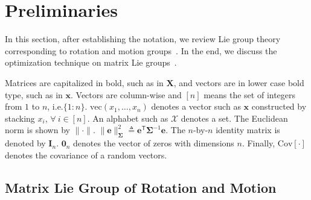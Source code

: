 \documentclass[conference]{IEEEtran}
\newcommand{\transpose}{\mathsf{T}}
\newcommand{\Cov}[1]{\mathrm{Cov}[#1]} %
\begin{document}
\section{Preliminaries}
\label{sec:preliminaries}

In this section, after establishing the notation, we review Lie group theory corresponding to rotation and motion groups~\citep{murray1994mathematical,chirikjian2011stochastic}. In the end, we discuss the optimization technique on matrix Lie groups~\citep{absil2009optimization}.

Matrices are capitalized in bold, such as in $\mathbf{X}$, and vectors are in lower case bold type, such as in $\mathbf{x}$. Vectors are column-wise and $[n]$ means the set of integers from $1$ to $n$, i.e.\@ \mbox{$\{1:n\}$}. $\mathrm{vec}(x_1,\dots,x_n)$ denotes a vector such as $\mathbf{x}$ constructed by stacking $x_i$, $\forall \ i \in [n]$. An alphabet such as $\mathcal{X}$ denotes a set. The Euclidean norm is shown by $\lVert \cdot \rVert$. $\lVert \mathbf{e} \rVert_{\boldsymbol\Sigma}^2 \triangleq \mathbf{e}^\transpose \boldsymbol\Sigma^{-1} \mathbf{e}$. The $n$-by-$n$ identity matrix is denoted by $\mathbf{I}_n$. $\mathbf{0}_n$ denotes the vector of zeros with dimensions $n$. Finally, $\Cov\cdot$ denotes the covariance of a random vectors.

\subsection{Matrix Lie Group of Rotation and Motion}
\end{document}
